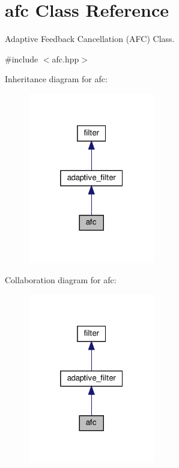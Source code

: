 \hypertarget{classafc}{}\section{afc Class Reference}
\label{classafc}


Adaptive Feedback Cancellation (A\+FC) Class.  




{\ttfamily \#include $<$afc.\+hpp$>$}



Inheritance diagram for afc\+:\nopagebreak
\begin{figure}[H]
\begin{center}
\leavevmode
\includegraphics[width=157pt]{classafc__inherit__graph}
\end{center}
\end{figure}


Collaboration diagram for afc\+:\nopagebreak
\begin{figure}[H]
\begin{center}
\leavevmode
\includegraphics[width=157pt]{classafc__coll__graph}
\end{center}
\end{figure}
